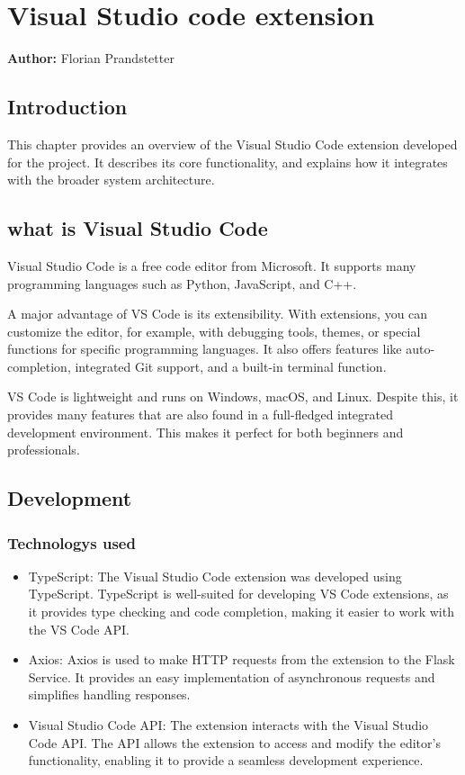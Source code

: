 \chapter{Visual Studio code extension}
\label{chap:VS_code_extension}
\textbf{Author:} Florian Prandstetter

\section{Introduction}

This chapter provides an overview of the Visual Studio Code extension developed for the project. It describes its core functionality, and explains how it integrates with the broader system architecture.

\section{what is Visual Studio Code}

Visual Studio Code is a free code editor from Microsoft. It supports many programming languages such as Python, JavaScript, and C++.

A major advantage of VS Code is its extensibility. With extensions, you can customize the editor, for example, with debugging tools, themes, or special functions for specific programming languages. It also offers features like auto-completion, integrated Git support, and a built-in terminal function.

VS Code is lightweight and runs on Windows, macOS, and Linux. Despite this, it provides many features that are also found in a full-fledged integrated development environment. This makes it perfect for both beginners and professionals.

\section{Development}

\subsection{Technologys used}

\begin{itemize}
    \item TypeScript: The Visual Studio Code extension was developed using TypeScript. TypeScript is well-suited for developing VS Code extensions, as it provides type checking and code completion, making it easier to work with the VS Code API.
    \item Axios: Axios is used to make HTTP requests from the extension to the Flask Service. It provides an easy implementation of asynchronous requests and simplifies handling responses.
    \item Visual Studio Code API: The extension interacts with the Visual Studio Code API. The API allows the extension to access and modify the editor's functionality, enabling it to provide a seamless development experience.
\end{itemize}

